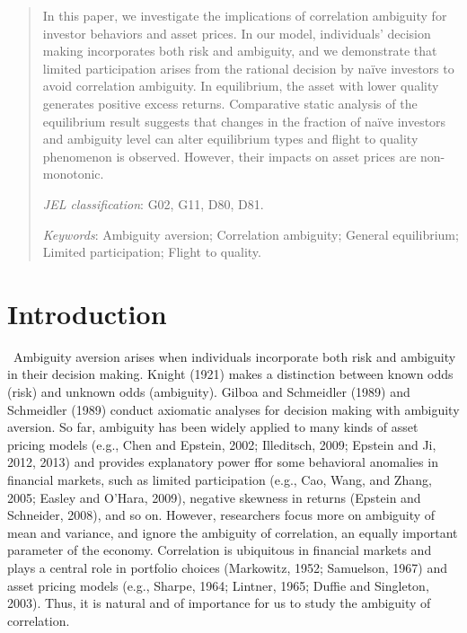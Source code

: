 \documentclass[10pt]{article}
\begin{document}
\begin{abstract}
In this paper, we investigate the implications of correlation ambiguity for investor behaviors and asset prices. In our model, individuals' decision making incorporates both risk and ambiguity, and we demonstrate that limited participation arises from the rational decision by na\"ive investors to avoid correlation ambiguity. In equilibrium, the asset with lower quality generates positive excess returns. Comparative static analysis of the equilibrium result suggests that changes in the fraction of na\"ive investors and ambiguity level can alter equilibrium types and flight to quality phenomenon is observed. However, their impacts on asset prices are non-monotonic. 

{\it JEL classification}: G02, G11, D80, D81.

{\it Keywords}: Ambiguity aversion; Correlation ambiguity; General equilibrium; Limited participation; Flight to quality.
\end{abstract}

\newpage

\section{Introduction}

\quad \ 
Ambiguity aversion arises when individuals incorporate both risk and ambiguity in their decision making. Knight (1921) makes a distinction between known odds (risk) and unknown odds (ambiguity). Gilboa and Schmeidler (1989) and Schmeidler (1989) conduct axiomatic analyses for decision making with ambiguity aversion. So far, ambiguity has been widely applied to many kinds of asset pricing models (e.g., Chen and Epstein, 2002; Illeditsch, 2009; Epstein and Ji, 2012, 2013) and provides explanatory power ffor some behavioral anomalies in financial markets, such as limited participation (e.g., Cao, Wang, and Zhang, 2005; Easley and O'Hara, 2009), negative skewness in returns (Epstein and Schneider, 2008), and so on. However, researchers focus more on ambiguity of mean and variance, and ignore the ambiguity of correlation, an equally important parameter of the economy. Correlation is ubiquitous in financial markets and plays a central role in portfolio choices (Markowitz, 1952; Samuelson, 1967) and asset pricing models (e.g., Sharpe, 1964; Lintner, 1965; Duffie and Singleton, 2003). Thus, it is natural and of importance for us to study the ambiguity of correlation. 
\end{document}
